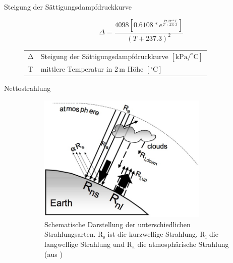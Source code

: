 \begin{description}
\item[Steigung der Sättigungsdampfdruckkurve]
\begin{equation}
\label{eq:delta}
\Delta=\frac{4098\left[0.6108*e^{\frac{17.27*T}{T+237.3}}\right]}{\left(T+237.3\right)^2}
\end{equation}
\begin{table}[H]
\centering
\begin{tabular}{ll}
$\mathrm{\Delta}$ & Steigung der Sättigungsdampfdruckkurve $\mathrm{[kPa/^{\circ}C]}$\\
T & mittlere Temperatur in 2\,m Höhe $\mathrm{[^{\circ}C]}$\\
\end{tabular}
\end{table}

\item[Nettostrahlung]

\begin{figure}[H]
\centering
\includegraphics[width=0.8\textwidth]{figures/strahlung.jpg}
\caption{Schematische Darstellung der unterschiedlichen Strahlungsarten. $\mathrm{R_{s}}$ ist die kurzwellige Strahlung, $\mathrm{R_{l}}$ die langwellige Strahlung und $\mathrm{R_{a}}$ die atmosphärische Strahlung (aus \cite{fao})}
\label{fig:strahlung}
\end{figure}


\end{description}
